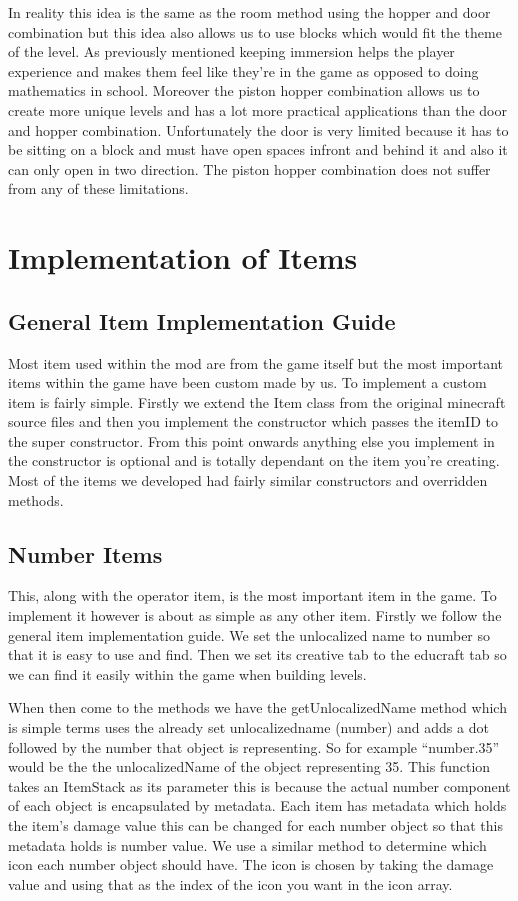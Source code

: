 In reality this idea is the same as the room method using the hopper and door combination but this idea also allows us to use blocks which would fit the theme of the level. As previously mentioned keeping immersion helps the player experience and makes them feel like they’re in the game as opposed to doing mathematics in school. Moreover the piston hopper combination allows us to create more unique levels and has a lot more practical applications than the door and hopper combination. Unfortunately the door is very limited because it has to be sitting on a block and must have open spaces infront and behind it and also it can only open in two direction. The piston hopper combination does not suffer from any of these limitations.

\section{Implementation of Items}
\subsection{General Item Implementation Guide}
Most item used within the mod are from the game itself but the most important items within the game have been custom made by us. To implement a custom item is fairly simple. Firstly we extend the Item class from the original minecraft source files and then you implement the constructor which passes the itemID to the super constructor. From this point onwards anything else you implement in the constructor is optional and is totally dependant on the item you're creating. Most of the items we developed had fairly similar constructors and overridden methods.

\subsection{Number Items}
This, along with the operator item, is the most important item in the game. To implement it however is about as simple as any other item. Firstly we follow the general item implementation guide. We set the unlocalized name to number so that it is easy to use and find. Then we set its creative tab to the educraft tab so we can find it easily within the game when building levels.

When then come to the methods we have the getUnlocalizedName method which is simple terms uses the already set unlocalizedname (number) and adds a dot followed by the number that object is representing. So for example “number.35” would be the the unlocalizedName of the object representing 35. This function takes an ItemStack as its parameter this is because the actual number component of each object is encapsulated by metadata. Each item has metadata which holds the item’s damage value this can be changed for each number object so that this metadata holds is number value. We use a similar method to determine which icon each number object should have. The icon is chosen by taking the damage value and using that as the index of the icon you want in the icon array.

